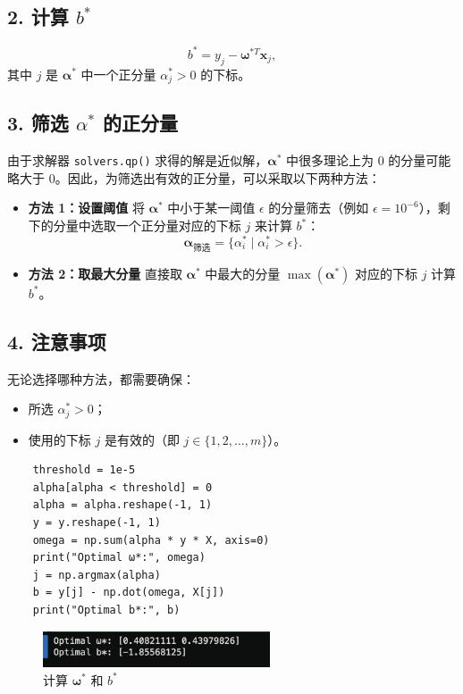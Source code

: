 \documentclass[12pt,a4paper,oneside]{article}
\begin{document}
\subsection*{2. 计算 $b^*$}
\[
b^* = y_j - \bm{\omega}^{*T} \bm{x}_j,
\]
其中 $j$ 是 $\bm{\alpha}^*$ 中一个正分量 $\alpha_j^* > 0$ 的下标。

\subsection*{3. 筛选 $\alpha^*$ 的正分量}
由于求解器 \texttt{solvers.qp()} 求得的解是近似解，$\bm{\alpha}^*$ 中很多理论上为 0 的分量可能略大于 0。因此，为筛选出有效的正分量，可以采取以下两种方法：
\begin{itemize}
    \item \textbf{方法 1：设置阈值}  
    将 $\bm{\alpha}^*$ 中小于某一阈值 $\epsilon$ 的分量筛去（例如 $\epsilon = 10^{-6}$），剩下的分量中选取一个正分量对应的下标 $j$ 来计算 $b^*$：
    \[
    \bm{\alpha}_\text{筛选} = \{\alpha_i^* \mid \alpha_i^* > \epsilon\}.
    \]
    \item \textbf{方法 2：取最大分量}  
    直接取 $\bm{\alpha}^*$ 中最大的分量 $\max(\bm{\alpha}^*)$ 对应的下标 $j$ 计算 $b^*$。
\end{itemize}

\subsection*{4. 注意事项}
无论选择哪种方法，都需要确保：
\begin{itemize}
    \item 所选 $\alpha_j^* > 0$；
    \item 使用的下标 $j$ 是有效的（即 $j \in \{1, 2, \dots, m\}$）。
\end{itemize}

\begin{lstlisting}
    threshold = 1e-5
    alpha[alpha < threshold] = 0  
    alpha = alpha.reshape(-1, 1)  
    y = y.reshape(-1, 1)     
    omega = np.sum(alpha * y * X, axis=0)  
    print("Optimal ω*:", omega)
    j = np.argmax(alpha)  
    b = y[j] - np.dot(omega, X[j])  
    print("Optimal b*:", b)
\end{lstlisting}

\begin{figure}[H]
    \centering
    \includegraphics[width=0.6\textwidth]{image/3.png}
    \caption{计算 $\bm{\omega}^*$ 和 $b^*$}
\end{figure}
\end{document}
